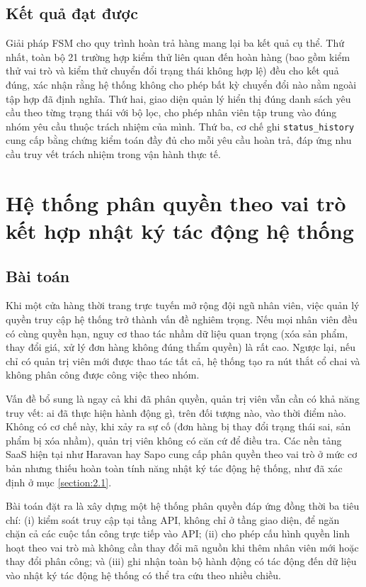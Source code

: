 \documentclass[../DoAn.tex]{subfiles}
\begin{document}
\subsection{Kết quả đạt được}
\label{subsection:5.1.3}

Giải pháp FSM cho quy trình hoàn trả hàng mang lại ba kết quả cụ thể. Thứ
nhất, toàn bộ 21 trường hợp kiểm thử liên quan đến hoàn hàng (bao gồm kiểm
thử vai trò và kiểm thử chuyển đổi trạng thái không hợp lệ) đều cho kết quả
đúng, xác nhận rằng hệ thống không cho phép bất kỳ chuyển đổi nào nằm ngoài
tập hợp đã định nghĩa. Thứ hai, giao diện quản lý hiển thị đúng danh sách yêu
cầu theo từng trạng thái với bộ lọc, cho phép nhân viên tập trung vào đúng
nhóm yêu cầu thuộc trách nhiệm của mình. Thứ ba, cơ chế ghi \texttt{status\_history}
cung cấp bằng chứng kiểm toán đầy đủ cho mỗi yêu cầu hoàn trả, đáp ứng nhu
cầu truy vết trách nhiệm trong vận hành thực tế.

\section{Hệ thống phân quyền theo vai trò kết hợp nhật ký tác động hệ thống}
\label{section:5.2}

\subsection{Bài toán}
\label{subsection:5.2.1}

Khi một cửa hàng thời trang trực tuyến mở rộng đội ngũ nhân viên, việc quản lý
quyền truy cập hệ thống trở thành vấn đề nghiêm trọng. Nếu mọi nhân viên đều
có cùng quyền hạn, nguy cơ thao tác nhầm dữ liệu quan trọng (xóa sản phẩm,
thay đổi giá, xử lý đơn hàng không đúng thẩm quyền) là rất cao. Ngược lại,
nếu chỉ có quản trị viên mới được thao tác tất cả, hệ thống tạo ra nút thắt
cổ chai và không phân công được công việc theo nhóm.

Vấn đề bổ sung là ngay cả khi đã phân quyền, quản trị viên vẫn cần có khả
năng truy vết: ai đã thực hiện hành động gì, trên đối tượng nào, vào thời
điểm nào. Không có cơ chế này, khi xảy ra sự cố (đơn hàng bị thay đổi trạng
thái sai, sản phẩm bị xóa nhầm), quản trị viên không có căn cứ để điều tra.
Các nền tảng SaaS hiện tại như Haravan hay Sapo cung cấp phân quyền theo vai
trò ở mức cơ bản nhưng thiếu hoàn toàn tính năng nhật ký tác động hệ thống,
như đã xác định ở mục \ref{section:2.1}.

Bài toán đặt ra là xây dựng một hệ thống phân quyền đáp ứng đồng thời ba tiêu
chí: (i) kiểm soát truy cập tại tầng API, không chỉ ở tầng giao diện, để
ngăn chặn cả các cuộc tấn công trực tiếp vào API; (ii) cho phép cấu hình
quyền linh hoạt theo vai trò mà không cần thay đổi mã nguồn khi thêm nhân
viên mới hoặc thay đổi phân công; và (iii) ghi nhận toàn bộ hành động có tác
động đến dữ liệu vào nhật ký tác động hệ thống có thể tra cứu theo nhiều chiều.
\end{document}
